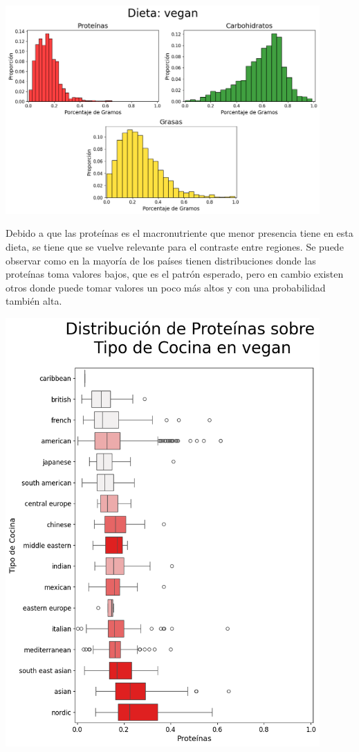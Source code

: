\documentclass[12pt,a4paper]{article}
\begin{document}
            \begin{center}
                \includegraphics[width=0.90\textwidth]{Resources/2_03_plot_05.png}
            \end{center}

            Debido a que las proteínas es el macronutriente que menor presencia tiene 
            en esta dieta, se tiene que se vuelve relevante para el contraste entre regiones. 
            Se puede observar como en la mayoría de los países tienen distribuciones donde 
            las proteínas toma valores bajos, que es el patrón esperado, pero en cambio 
            existen otros donde puede tomar valores un poco más altos y con una probabilidad 
            también alta.

            \begin{center}
                \includegraphics[width=0.90\textwidth]{Resources/2_03_plot_05_2.png}
            \end{center}
\end{document}
